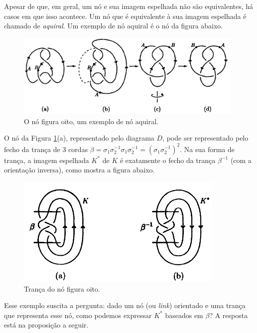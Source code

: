 	Apesar de que, em geral, um nó e sua imagem espelhada não são equivalentes, 
	há casos em que isso acontece. Um nó que é equivalente à sua imagem espelhada 
	é chamado de \textit{aquiral}. Um exemplo de nó aquiral é o nó da figura abaixo.
	\begin{figure}[H]
		\begin{center}
			\includegraphics[width=11cm]{Images/no_aquiral.png}
		\end{center}\caption{O nó figura oito, um exemplo de nó aquiral.}\label{no aquiral}
	\end{figure}
	O nó da Figura \ref{no aquiral}(a), representado pelo diagrama $D$, pode ser 
	representado pelo fecho da trança de $3$ cordas 
	$\beta = \sigma_1\sigma_2^{-1}\sigma_1\sigma_2^{-1} = (\sigma_1\sigma_2^{-1})^2$. 
	Na sua forma de trança, a imagem espelhada $K^\ast$ de $K$ é exatamente o fecho 
	da trança $\beta^{-1}$ (com a orientação inversa), como mostra a figura abaixo.
	\begin{figure}[H]
		\begin{center}
			\includegraphics[width=10cm]{Images/tranca_no_de_oito.png}
		\end{center}\caption{Trança do nó figura oito.}\label{tranca no de oito}
	\end{figure} 
	Esse exemplo suscita a pergunta: dado um nó (ou \textit{link}) orientado e uma trança 
	que representa esse nó, como podemos expressar $K^\ast$ baseados em $\beta$? 
	A resposta está na proposição a seguir.
